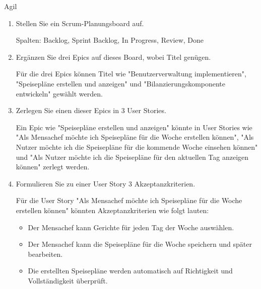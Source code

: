 \documentclass{article}
\begin{document}
\begin{exercise}{Agil}
  \begin{enumerate}
    \item Stellen Sie ein Scrum-Planungsboard auf.

          \begin{solution}
            Spalten: Backlog, Sprint Backlog, In Progress, Review, Done
          \end{solution}

    \item Ergänzen Sie drei Epics auf dieses Board, wobei Titel genügen.

          \begin{solution}
            Für die drei Epics können Titel wie "Benutzerverwaltung implementieren", "Speisepläne erstellen und anzeigen" und "Bilanzierungskomponente entwickeln" gewählt werden.
          \end{solution}

    \item Zerlegen Sie einen dieser Epics in 3 User Stories.

          \begin{solution}
            Ein Epic wie "Speisepläne erstellen und anzeigen" könnte in User Stories wie "Als Mensachef möchte ich Speisepläne für die Woche erstellen können", "Als Nutzer möchte ich die Speisepläne für die kommende Woche einsehen können" und "Als Nutzer möchte ich die Speisepläne für den aktuellen Tag anzeigen können" zerlegt werden.
          \end{solution}

    \item Formulieren Sie zu einer User Story 3 Akzeptanzkriterien.

          \begin{solution}
            Für die User Story "Als Mensachef möchte ich Speisepläne für die Woche erstellen können" könnten Akzeptanzkriterien wie folgt lauten:
            \begin{itemize}
              \item Der Mensachef kann Gerichte für jeden Tag der Woche auswählen.
              \item Der Mensachef kann die Speisepläne für die Woche speichern und später bearbeiten.
              \item Die erstellten Speisepläne werden automatisch auf Richtigkeit und Vollständigkeit überprüft.
            \end{itemize}
          \end{solution}
  \end{enumerate}

\end{exercise}
\end{document}
